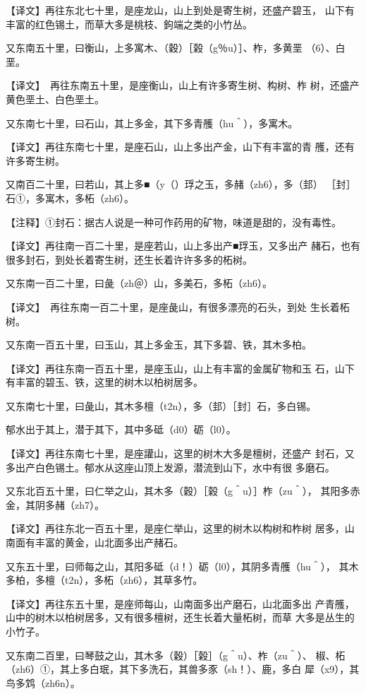\documentclass[a4paper,12pt,UTF8,twoside]{ctexbook}
\begin{document}
【译文】再往东北七十里，是座龙山，山上到处是寄生树，还盛产碧玉， 山下有丰富的红色锡土，而草大多是桃枝、鉤端之类的小竹丛。

又东南五十里，曰衡山，上多寓木、（穀）［榖（g％u）］、柞，多黄垩 （6）、白垩。

【译文】　再往东南五十里，是座衡山，山上有许多寄生树、构树、柞 树，还盛产黄色垩土、白色垩土。

又东南七十里，曰石山，其上多金，其下多青雘（hu＾），多寓木。

【译文】再往东南七十里，是座石山，山上多出产金，山下有丰富的青 雘，还有许多寄生树。

又南百二十里，曰若山，其上多■（y（）琈之玉，多赭（zh6），多（邽） ［封］石①，多寓木，多柘（zh6）。

【注释】①封石：据古人说是一种可作药用的矿物，味道是甜的，没有毒性。

【译文】再往南一百二十里，是座若山，山上多出产■琈玉，又多出产 赭石，也有很多封石，到处长着寄生树，还生长着许许多多的柘树。

又东南一百二十里，曰彘（zh＠）山，多美石，多柘（zh6）。

【译文】　再往东南一百二十里，是座彘山，有很多漂亮的石头，到处 生长着柘树。

又东南一百五十里，曰玉山，其上多金玉，其下多碧、铁，其木多柏。

【译文】再往东南一百五十里，是座玉山，山上有丰富的金属矿物和玉 石，山下有丰富的碧玉、铁，这里的树木以柏树居多。

又东南七十里，曰彘山，其木多檀（t2n），多（邽）［封］石，多白锡。

郁水出于其上，潜于其下，其中多砥（d0）砺（l0）。

【译文】再往东南七十里，是座讙山，这里的树木大多是檀树，还盛产 封石，又多出产白色锡土。郁水从这座山顶上发源，潜流到山下，水中有很 多磨石。

又东北百五十里，曰仁举之山，其木多（穀）［榖（g＾u）］柞（zu＾）， 其阳多赤金，其阴多赭（zh7）。

【译文】再往东北一百五十里，是座仁举山，这里的树木以构树和柞树 居多，山南面有丰富的黄金，山北面多出产赭石。

又东五十里，曰师每之山，其阳多砥（d！）砺（l0），其阴多青雘（hu＾）， 其木多柏，多檀（t2n），多柘（zh6），其草多竹。

【译文】再往东五十里，是座师每山，山南面多出产磨石，山北面多出 产青雘，山中的树木以柏树居多，又有很多檀树，还生长着大量柘树，而草 大多是丛生的小竹子。

又东南二百里，曰琴鼓之山，其木多（穀）［榖］（g＾u）、柞（zu＾）、 椒、柘（zh6）①，其上多白珉，其下多洗石，其兽多豕（sh！）、鹿，多白 犀（x9），其鸟多鸩（zh6n）。
\end{document}
